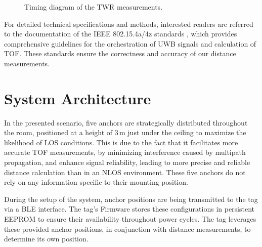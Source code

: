 \documentclass[final, conference, a4paper]{IEEEtran}
\begin{document}
\begin{figure}[hbt!]
	\centering
	\caption{Timing diagram of the \ac{TWR} measurements.}
	\label{fig:csvbarchart}
\end{figure}

For detailed technical specifications and methods, interested readers are referred to the documentation of the IEEE 802.15.4a/4z standards \cite{IEEE802154a} \cite{IEEE802154z}, which provides comprehensive guidelines for the orchestration of \ac{UWB} signals and calculation of \ac{TOF}.
These standards ensure the correctness and accuracy of our distance measurements.

\section{System Architecture}\label{section:system_arch}
In the presented scenario, five anchors are strategically distributed throughout the room,
positioned at a height of 3\,m just under the ceiling to maximize the likelihood of 
\ac{LOS} conditions.
This is due to the fact that it facilitates more accurate \ac{TOF} measurements, by minimizing interference caused by multipath propagation, and enhance signal reliability,
leading to more precise and reliable distance calculation than in an \ac{NLOS} environment.
These five anchors do not rely on any information specific to their mounting position.

During the setup of the system, anchor positions are being transmitted to the tag via a \ac{BLE} interface.
The tag's Firmware stores these configurations in persistent \ac{EEPROM} to ensure their availability throughout power cycles.
The tag leverages these provided anchor positions, in conjunction with distance measurements, to determine its own position. 
\end{document}
